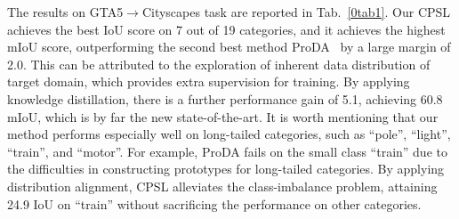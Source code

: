 \documentclass[10pt,twocolumn,letterpaper]{article}
\begin{document}
	\vspace{0.1em}  The results on GTA5$\to$Cityscapes task are reported in Tab.~\ref{0tab1}. Our CPSL achieves the best IoU score on 7 out of 19 categories, and it achieves the highest mIoU score, outperforming the second best method ProDA~\cite{zhang2021prototypical} by a large margin of 2.0. This can be attributed to the exploration of inherent data distribution of target domain, which provides extra supervision for training. By applying knowledge distillation, there is a further performance gain of 5.1, achieving 60.8 mIoU, which is by far the new state-of-the-art. It is worth mentioning that our method performs especially well on long-tailed categories, such as ``pole'', ``light'', ``train'', and ``motor''. For example, ProDA fails on the small class ``train'' due to the difficulties in constructing prototypes for long-tailed categories. By applying distribution alignment, CPSL alleviates the class-imbalance problem, attaining 24.9 IoU on ``train'' without sacrificing the performance on other categories.
\end{document}
